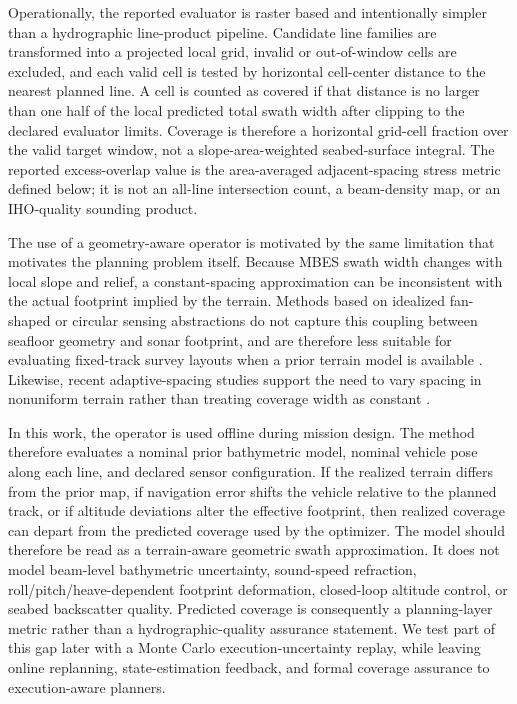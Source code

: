 \documentclass[jmse,article,submit,moreauthors]{Definitions/mdpi}
\begin{document}
Operationally, the reported evaluator is raster based and intentionally simpler than a hydrographic line-product pipeline. Candidate line families are transformed into a projected local grid, invalid or out-of-window cells are excluded, and each valid cell is tested by horizontal cell-center distance to the nearest planned line. A cell is counted as covered if that distance is no larger than one half of the local predicted total swath width after clipping to the declared evaluator limits. Coverage is therefore a horizontal grid-cell fraction over the valid target window, not a slope-area-weighted seabed-surface integral. The reported excess-overlap value is the area-averaged adjacent-spacing stress metric defined below; it is not an all-line intersection count, a beam-density map, or an IHO-quality sounding product.

The use of a geometry-aware operator is motivated by the same limitation that motivates the planning problem itself. Because MBES swath width changes with local slope and relief, a constant-spacing approximation can be inconsistent with the actual footprint implied by the terrain. Methods based on idealized fan-shaped or circular sensing abstractions do not capture this coupling between seafloor geometry and sonar footprint, and are therefore less suitable for evaluating fixed-track survey layouts when a prior terrain model is available \cite{xie2024three,mu2025coverage}. Likewise, recent adaptive-spacing studies support the need to vary spacing in nonuniform terrain rather than treating coverage width as constant \cite{zhang2022online,yan2024dual}.

In this work, the operator is used offline during mission design. The method therefore evaluates a nominal prior bathymetric model, nominal vehicle pose along each line, and declared sensor configuration. If the realized terrain differs from the prior map, if navigation error shifts the vehicle relative to the planned track, or if altitude deviations alter the effective footprint, then realized coverage can depart from the predicted coverage used by the optimizer. The model should therefore be read as a terrain-aware geometric swath approximation. It does not model beam-level bathymetric uncertainty, sound-speed refraction, roll/pitch/heave-dependent footprint deformation, closed-loop altitude control, or seabed backscatter quality. Predicted coverage is consequently a planning-layer metric rather than a hydrographic-quality assurance statement. We test part of this gap later with a Monte Carlo execution-uncertainty replay, while leaving online replanning, state-estimation feedback, and formal coverage assurance to execution-aware planners.
\end{document}
